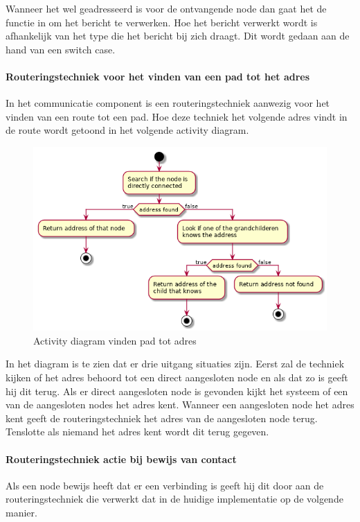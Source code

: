 \documentclass[a4paper, 11pt, oneside]{report}
\begin{document}
Wanneer het wel geadresseerd is voor de ontvangende node dan gaat het de functie in om het bericht te verwerken. Hoe het bericht verwerkt wordt is afhankelijk van het type die het bericht bij zich draagt. Dit wordt gedaan aan de hand van een switch case.

\paragraph{Routeringstechniek voor het vinden van een pad tot het adres}
\label{DetailedDesign:Communicatie:Activity:routeringtechniek:aanvraag}
In het communicatie component is een routeringstechniek aanwezig voor het vinden van een route tot een pad. Hoe deze techniek het volgende adres vindt in de route wordt getoond in het volgende activity diagram. 

\begin{figure}[H]
	\begin{center}\includegraphics[width=.45\linewidth]{UML/out/Communication/activity/padtotadres/padtotadres.png}\end{center}
	\caption{Activity diagram vinden pad tot adres}
	\label{fig:communication:routeringtechniek:aanvraag}
\end{figure}

In het diagram is te zien dat er drie uitgang situaties zijn. 
Eerst zal de techniek kijken of het adres behoord tot een direct aangesloten node en als dat zo is geeft hij dit terug.
Als er direct aangesloten node is gevonden kijkt het systeem of een van de aangesloten nodes het adres kent.
Wanneer een aangesloten node het adres kent geeft de routeringstechniek het adres van de aangesloten node terug.
Tenslotte als niemand het adres kent wordt dit terug gegeven.

\paragraph{Routeringstechniek actie bij bewijs van contact}
\label{DetailedDesign:Communicatie:Activity:routeringtechniek:contactgevonden}
Als een node bewijs heeft dat er een verbinding is geeft hij dit door aan de routeringstechniek die verwerkt dat in de huidige implementatie op de volgende manier.
\end{document}
